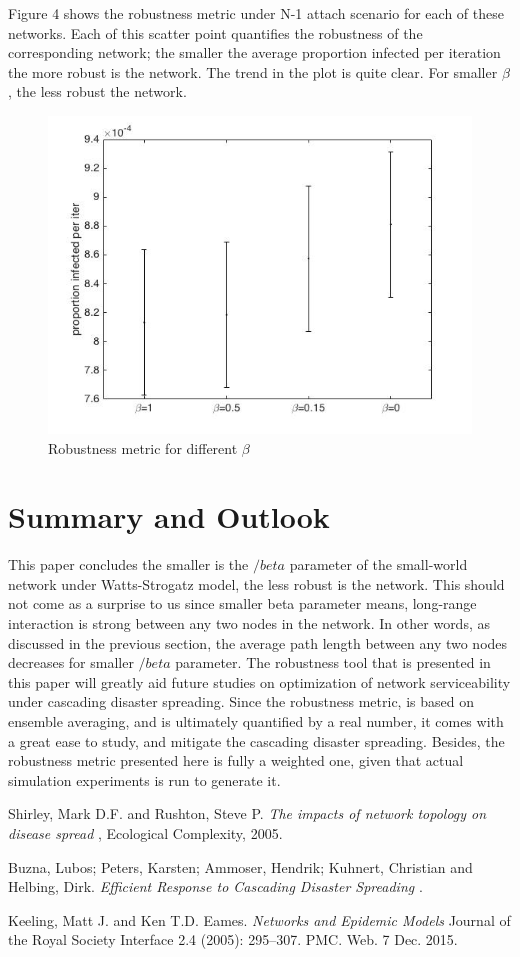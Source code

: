 \documentclass[11pt]{article}
\begin{document}
Figure 4 shows the robustness metric under N-1 attach scenario for each of these networks. Each of this scatter point quantifies the robustness of the corresponding network; the smaller the average proportion infected per iteration the more robust is the network. The trend in the plot is quite clear. For smaller $\beta$, the less robust the network. 

\begin{figure}[t!]
\centering
\includegraphics[width=0.70\columnwidth]{images/periter.jpg}
\caption{Robustness metric for different $\beta$}
\end{figure}
\clearpage

\section{Summary and Outlook}
This paper concludes the smaller is the $/beta$ parameter of the small-world network under Watts-Strogatz model, the less robust is the network. This should not come as a surprise to us since smaller beta parameter means, long-range interaction is strong between any two nodes in the network. In other words, as discussed in the previous section, the average path length between any two nodes decreases for smaller $/beta$ parameter. The robustness tool that is presented in this paper will greatly aid future studies on optimization of network serviceability under cascading disaster spreading. Since the robustness metric, is based on ensemble averaging, and is ultimately quantified by a real number, it comes with a great ease to study, and mitigate the cascading disaster spreading. Besides, the robustness metric presented here is fully a weighted one, given that actual simulation experiments is run to generate it. 



\newpage
\begin{thebibliography}{9}
 Shirley, Mark D.F. and Rushton, Steve P. \textit{ The impacts of network topology on disease spread }, Ecological Complexity, 2005.

 Buzna, Lubos; Peters, Karsten; Ammoser, Hendrik;  Kuhnert, Christian and Helbing, Dirk.\textit{ Efficient Response to Cascading Disaster Spreading } .

Keeling, Matt J. and Ken T.D. Eames. \textit{ Networks and Epidemic Models } Journal of the Royal Society Interface 2.4 (2005): 295–307. PMC. Web. 7 Dec. 2015.

\end{thebibliography}
\end{document}

